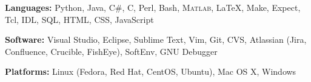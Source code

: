 

\textbf{Languages:} Python, Java, C\#, C, Perl, Bash, \textsc{Matlab}, \LaTeX, Make, Expect, Tcl, IDL, SQL, HTML, CSS, JavaScript

\vspace{5pt}

\textbf{Software:} Visual Studio, Eclipse, Sublime Text, Vim, Git, CVS, Atlassian (Jira, Confluence, Crucible, FishEye), SoftEnv, GNU Debugger

\vspace{5pt}

\textbf{Platforms:} Linux (Fedora, Red Hat, CentOS, Ubuntu), Mac OS X, Windows
